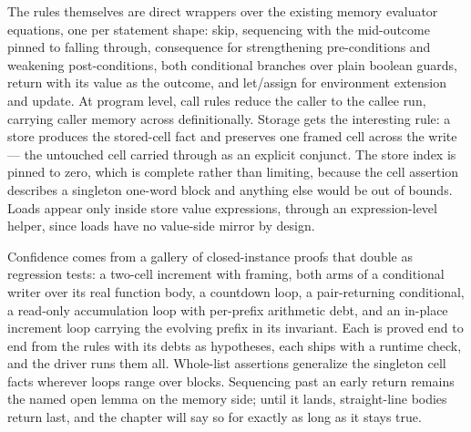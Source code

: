 The rules themselves are direct wrappers over the existing memory
evaluator equations, one per statement shape: skip, sequencing with the
mid-outcome pinned to falling through, consequence for strengthening
pre-conditions and weakening post-conditions, both conditional branches
over plain boolean guards, return with its value as the outcome, and
let/assign for environment extension and update. At program level, call
rules reduce the caller to the callee run, carrying caller memory
across definitionally. Storage gets the
interesting rule: a store produces the stored-cell fact and preserves
one framed cell across the write --- the untouched cell carried through
as an explicit conjunct. The store index is pinned to zero, which is
complete rather than limiting, because the cell assertion describes a
singleton one-word block and anything else would be out of bounds.
Loads appear only inside store value expressions, through an
expression-level helper, since loads have no value-side mirror by
design.

Confidence comes from a gallery of closed-instance proofs that double
as regression tests: a two-cell increment with framing, both arms of a
conditional writer over its real function body, a countdown loop, a
pair-returning conditional, a read-only accumulation loop with
per-prefix arithmetic debt, and an in-place increment loop carrying
the evolving prefix in its invariant. Each is proved end to end from
the rules with its debts as hypotheses, each ships with a runtime
check, and the driver runs them all. Whole-list assertions generalize
the singleton cell facts wherever loops range over blocks. Sequencing
past an early return remains the named open lemma on the memory side;
until it lands, straight-line bodies return last, and the chapter will
say so for exactly as long as it stays true.
